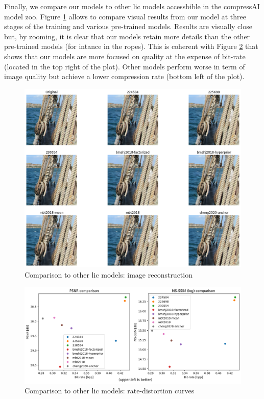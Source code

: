 Finally, we compare our models to other \acrshort{lic} models accessbible in the compressAI model zoo. Figure \ref{balle_repro_5} allows to compare visual results from our model at three stages of the training and various pre-trained models. Results are visually close but, by zooming, it is clear that our models retain more details than the other pre-trained models (for intance in the ropes). This is coherent with Figure \ref{balle_repro_6} that shows that our models are more focused on quality at the expense of bit-rate (located in the top right of the plot). Other models perform worse in term of image quality but achieve a lower compression rate (bottom left of the plot).

\begin{figure}
    \centering
    \includegraphics[width=15cm]{img/balle_repro_5.png}
    \caption{Comparison to other \acrshort{lic} models: image reconstruction}
    \label{balle_repro_5}
\end{figure}

\begin{figure}
    \centering
    \includegraphics[width=15cm]{img/balle_repro_6.png}
    \caption{Comparison to other \acrshort{lic} models: rate-distortion curves}
    \label{balle_repro_6}
\end{figure}

